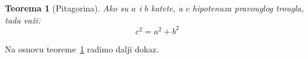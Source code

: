 \documentclass[11pt]{article}
\newtheorem{thm}{Teorema}
\begin{document}
	\begin{thm}[Pitagorina] \label{pitagora}
		Ako su $ a $ i $ b $ katete, a $ c $ hipotenuza pravouglog trougla,
		tada va\v zi:
		\begin{equation*}
			c^2 = a^2 + b^2
		\end{equation*}
	\end{thm}

	Na osnovu teoreme~\ref{pitagora} radimo dalji dokaz.
\end{document}
